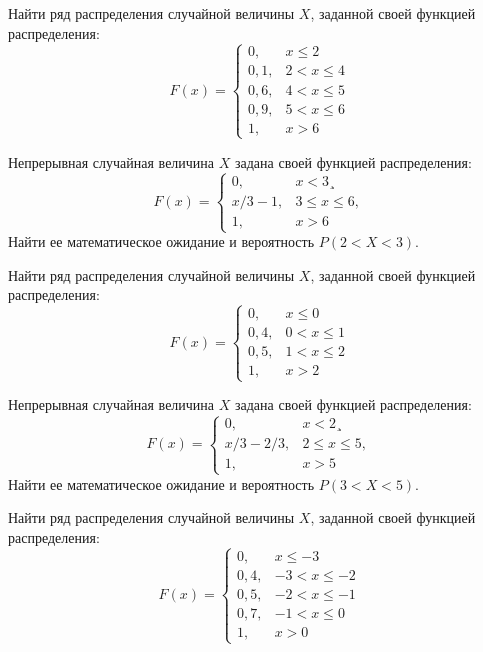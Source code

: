 \vfill

\newpage\setcounter{zad}{0}

\z Найти ряд распределения случайной величины $X$, заданной своей функцией распределения: $$ F(x) = \begin{cases}0, & x \leqslant 2 \\ 0{,}1, & 2 < x \leqslant 4 \\ 0{,}6, & 4 < x \leqslant 5 \\ 0{,}9, & 5 < x \leqslant 6 \\ 1, & x > 6 \end{cases} $$


\vfill

\z Непрерывная случайная величина $X$ задана своей функцией распределения: $$ F(x) = \begin{cases}0, & x < 3¸\\ x/3-1, & 3 \leqslant x \leqslant 6, \\ 1, & x > 6 \end{cases} $$ Найти ее математическое ожидание и вероятность $P(2 < X < 3)$.
 

\vfill

\newpage\setcounter{zad}{0}

\z Найти ряд распределения случайной величины $X$, заданной своей функцией распределения: $$ F(x) = \begin{cases}0, & x \leqslant 0 \\ 0{,}4, & 0 < x \leqslant 1 \\ 0{,}5, & 1 < x \leqslant 2 \\ 1, & x > 2 \end{cases} $$


\vfill

\z Непрерывная случайная величина $X$ задана своей функцией распределения: $$ F(x) = \begin{cases}0, & x < 2¸\\ x/3-2/3, & 2 \leqslant x \leqslant 5, \\ 1, & x > 5 \end{cases} $$ Найти ее математическое ожидание и вероятность $P(3 < X < 5)$.
 

\vfill

\newpage\setcounter{zad}{0}

\z Найти ряд распределения случайной величины $X$, заданной своей функцией распределения: $$ F(x) = \begin{cases}0, & x \leqslant -3 \\ 0{,}4, & -3 < x \leqslant -2 \\ 0{,}5, & -2 < x \leqslant -1 \\ 0{,}7, & -1 < x \leqslant 0 \\ 1, & x > 0 \end{cases} $$


